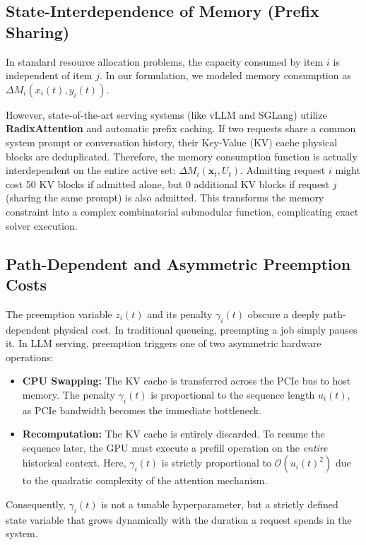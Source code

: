 \documentclass[11pt]{article}
\begin{document}
\subsection{State-Interdependence of Memory (Prefix Sharing)}
\label{subsec:caveat_prefix_sharing}

In standard resource allocation problems, the capacity consumed by item $i$ is independent of item $j$. In our formulation, we modeled memory consumption as $\Delta M_i(x_i(t), y_i(t))$. 

However, state-of-the-art serving systems (like vLLM and SGLang) utilize \textbf{RadixAttention} and automatic prefix caching. If two requests share a common system prompt or conversation history, their Key-Value (KV) cache physical blocks are deduplicated. Therefore, the memory consumption function is actually interdependent on the entire active set: $\Delta M_i(\mathbf{x}_t, U_t)$. Admitting request $i$ might cost 50 KV blocks if admitted alone, but $0$ additional KV blocks if request $j$ (sharing the same prompt) is also admitted. This transforms the memory constraint into a complex combinatorial submodular function, complicating exact solver execution.

\subsection{Path-Dependent and Asymmetric Preemption Costs}
\label{subsec:caveat_preemption}

The preemption variable $z_i(t)$ and its penalty $\gamma_i(t)$ obscure a deeply path-dependent physical cost. In traditional queueing, preempting a job simply pauses it. In LLM serving, preemption triggers one of two asymmetric hardware operations:
\begin{itemize}
    \item \textbf{CPU Swapping:} The KV cache is transferred across the PCIe bus to host memory. The penalty $\gamma_i(t)$ is proportional to the sequence length $u_i(t)$, as PCIe bandwidth becomes the immediate bottleneck.
    \item \textbf{Recomputation:} The KV cache is entirely discarded. To resume the sequence later, the GPU must execute a prefill operation on the \textit{entire} historical context. Here, $\gamma_i(t)$ is strictly proportional to $\mathcal{O}(u_i(t)^2)$ due to the quadratic complexity of the attention mechanism.
\end{itemize}
Consequently, $\gamma_i(t)$ is not a tunable hyperparameter, but a strictly defined state variable that grows dynamically with the duration a request spends in the system.
\end{document}
